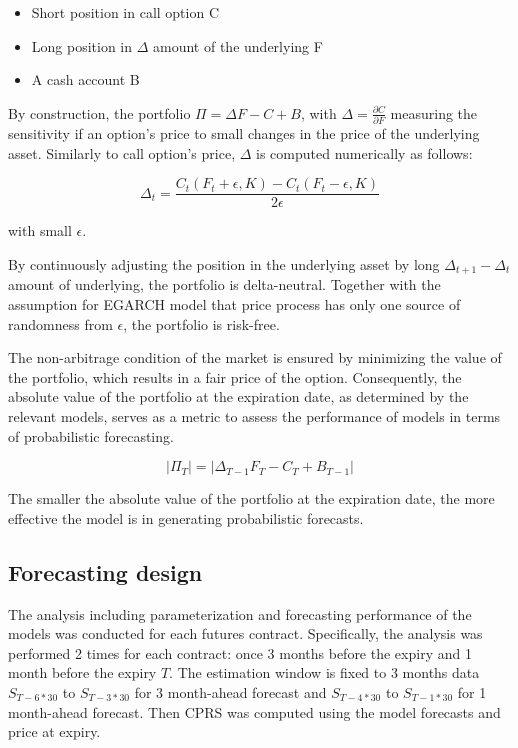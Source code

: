 \documentclass[12pt,a4paper]{article}
\numberwithin{equation}{section}
\begin{document}
\begin{itemize}
\item Short position in call option C
\item Long position in $\Delta$ amount of the underlying F
\item A cash account B
\end{itemize}

By construction, the portfolio $\Pi = \Delta F - C + B$, with $\Delta = \frac{\partial C}{\partial F}$ measuring the sensitivity if an option's price to small changes in the price of the underlying asset. Similarly to call option's price, $\Delta$ is computed numerically as follows:

\[\Delta_t = \frac{C_t(F_t+\epsilon, K) - C_t(F_t - \epsilon, K)}{2\epsilon}\] 

with small $\epsilon$.

By continuously adjusting the position in the underlying asset by long $\Delta_{t+1} - \Delta_t$ amount of underlying, the portfolio is delta-neutral. Together with the assumption for EGARCH model that price process has only one source of randomness from $\epsilon$, the portfolio is risk-free. 

The non-arbitrage condition of the market is ensured by minimizing the value of the portfolio, which results in a fair price of the option. Consequently, the absolute value of the portfolio at the expiration date, as determined by the relevant models, serves as a metric to assess the performance of models in terms of probabilistic forecasting. 

\[|\Pi_T| = |\Delta_{T-1} F_T - C_T + B_{T-1}|\]

The smaller the absolute value of the portfolio at the expiration date, the more effective the model is in generating probabilistic forecasts.


\subsection{Forecasting design}

The analysis including parameterization and forecasting performance of the models was conducted for each futures contract. Specifically, the analysis was performed 2 times for each contract: once 3 months before the expiry and 1 month before the expiry $T$. The estimation window is fixed to 3 months data $S_{T-6*30}$ to $S_{T-3*30}$ for 3 month-ahead forecast and $S_{T-4*30}$ to $S_{T-1*30}$ for 1 month-ahead forecast. Then CPRS was computed using the model forecasts and price at expiry.
\end{document}
